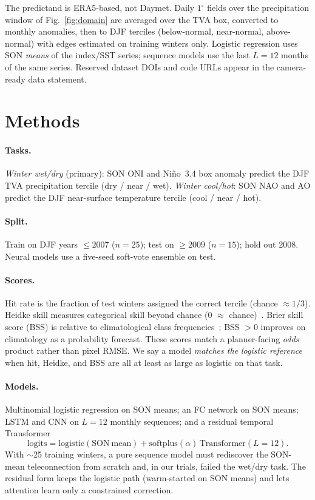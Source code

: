 \documentclass{article}
\begin{document}
The predictand is ERA5-based, not Daymet. Daily \(1^{\circ}\) fields over the precipitation window of Fig.~\ref{fig:domain} are averaged over the TVA box, converted to monthly anomalies, then to DJF terciles (below-normal, near-normal, above-normal) with edges estimated on training winters only. Logistic regression uses SON \emph{means} of the index/SST series; sequence models use the last \(L{=}12\) months of the same series. Reserved dataset DOIs and code URLs appear in the camera-ready data statement.

\section{Methods}

\paragraph{Tasks.}
\emph{Winter wet/dry} (primary): SON ONI and Ni\~{n}o~3.4 box anomaly predict the DJF TVA precipitation tercile (dry / near / wet). \emph{Winter cool/hot}: SON NAO and AO predict the DJF near-surface temperature tercile (cool / near / hot).

\paragraph{Split.}
Train on DJF years \(\le 2007\) (\(n{=}25\)); test on \(\ge 2009\) (\(n{=}15\)); hold out 2008. Neural models use a five-seed soft-vote ensemble on test.

\paragraph{Scores.}
Hit rate is the fraction of test winters assigned the correct tercile (chance \(\approx 1/3\)). Heidke skill measures categorical skill beyond chance (\(0\) \(\approx\) chance)~\citep{heidke1926,wilks2011}. Brier skill score (BSS) is relative to climatological class frequencies~\citep{brier1950,wilks2011}; BSS \(>0\) improves on climatology as a probability forecast. These scores match a planner-facing \emph{odds} product rather than pixel RMSE. We say a model \emph{matches the logistic reference} when hit, Heidke, and BSS are all at least as large as logistic on that task.

\paragraph{Models.}
Multinomial logistic regression on SON means; an FC network on SON means; LSTM and CNN on \(L{=}12\) monthly sequences; and a residual temporal Transformer~\citep{vaswani2017attention}
\begin{equation}
\mathrm{logits}=\mathrm{logistic}(\mathrm{SON\ mean})+\mathrm{softplus}(\alpha)\,\mathrm{Transformer}(L{=}12).
\end{equation}
With \(\sim\)25 training winters, a pure sequence model must rediscover the SON-mean teleconnection from scratch and, in our trials, failed the wet/dry task. The residual form keeps the logistic path (warm-started on SON means) and lets attention learn only a constrained correction.
\end{document}
